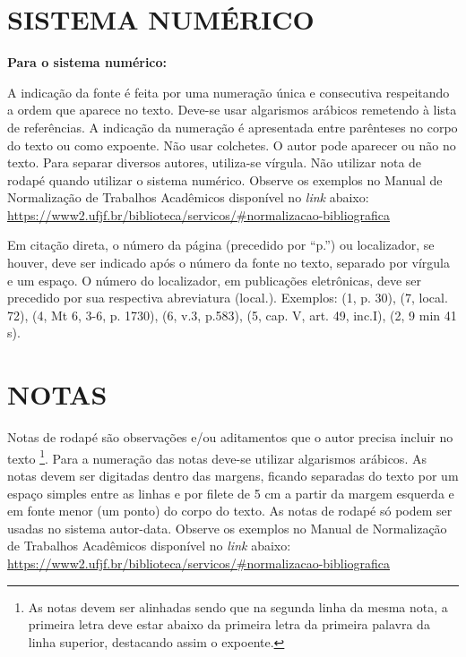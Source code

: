 \documentclass[
  oneside, %
  english,
  brazil
]{abntbibufjf}
\begin{document}
\section{SISTEMA NUMÉRICO} %

\textbf{Para o sistema numérico:}

A indicaç\~{a}o da fonte é feita por uma numeraç\~{a}o única e consecutiva respeitando a ordem que aparece no texto. Deve-se usar algarismos arábicos remetendo à lista de referências. A indicaç\~{a}o da numeraç\~{a}o é apresentada entre parênteses no corpo do texto ou como expoente. Não usar colchetes. O autor pode aparecer ou não no texto. Para separar diversos autores, utiliza-se vírgula. N\~{a}o utilizar nota de rodap\'{e} quando utilizar o sistema num\'{e}rico.
Observe os exemplos no Manual de Normalizaç\~{a}o de Trabalhos Acadêmicos disponível no \textit{link} abaixo: \\
\url{https://www2.ufjf.br/biblioteca/servicos/#normalizacao-bibliografica}

Em citação direta, o número da página (precedido por ``p.'') ou localizador, se houver, deve ser indicado após o número da fonte no texto, separado por vírgula e um espaço. O número do localizador, em publicações eletrônicas, deve ser precedido por sua respectiva abreviatura (local.). Exemplos: (1, p. 30), (7, local. 72), (4, Mt 6, 3-6, p. 1730), (6, v.3, p.583), (5, cap. V, art. 49, inc.I), (2, 9 min 41 s).

\section{NOTAS} %

Notas de rodapé são observaç\~{o}es e/ou aditamentos que o autor precisa incluir no texto \footnote[2]{As notas devem ser alinhadas sendo que na segunda linha da mesma nota, a primeira letra deve estar abaixo da primeira letra da primeira palavra da linha superior, destacando assim o expoente.}. Para a numeraç\~{a}o das notas deve-se utilizar algarismos arábicos. As notas devem ser digitadas dentro das margens, ficando separadas do texto por um espaço simples entre as linhas e por filete de 5 cm a partir da margem esquerda e em fonte menor (um ponto) do corpo do texto. As notas de rodapé só podem ser usadas no sistema autor-data. Observe os exemplos no Manual de Normalizaç\~{a}o de Trabalhos Acadêmicos disponível no \textit{link} abaixo: \\
\url{https://www2.ufjf.br/biblioteca/servicos/#normalizacao-bibliografica}
\end{document}
